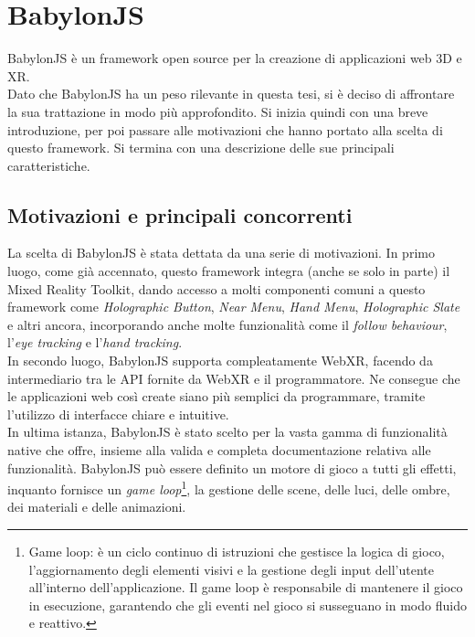 \section{BabylonJS}\label{sec:BabylonJS}
BabylonJS è un framework open source per la creazione di applicazioni web 3D e XR\cite{BabylonJS}.\\
Dato che BabylonJS ha un peso rilevante in questa tesi, si è deciso di affrontare la sua trattazione in modo più approfondito. Si inizia quindi con una breve introduzione, per poi
passare alle motivazioni che hanno portato alla scelta di questo framework. Si termina con una descrizione delle sue principali caratteristiche.\\

\subsection{Motivazioni e principali concorrenti}\label{subsec:BabylonJS_motivazioni}
La scelta di BabylonJS è stata dettata da una serie di motivazioni. In primo luogo, come già accennato, questo framework integra (anche se solo in parte) il Mixed Reality
Toolkit, dando accesso a molti componenti comuni a questo framework come \textit{Holographic Button}, \textit{Near Menu}, \textit{Hand Menu}, \textit{Holographic Slate} e altri 
ancora, incorporando anche molte funzionalità come il \textit{follow behaviour}, l'\textit{eye tracking} e l'\textit{hand tracking}.\\
In secondo luogo, BabylonJS supporta compleatamente WebXR, facendo da intermediario tra le API fornite da WebXR e il programmatore. Ne consegue che le applicazioni web così
create siano più semplici da programmare, tramite l'utilizzo di interfacce chiare e intuitive.\\
In ultima istanza, BabylonJS è stato scelto per la vasta gamma di funzionalità native che offre, insieme alla valida e completa documentazione relativa alle funzionalità. BabylonJS
può essere definito un motore di gioco a tutti gli effetti, inquanto fornisce un \textit{game loop}\footnote{
    Game loop: è un ciclo continuo di istruzioni che gestisce la logica di gioco, l'aggiornamento degli elementi visivi e la gestione degli input dell'utente all'interno 
    dell'applicazione. Il game loop è responsabile di mantenere il gioco in esecuzione, garantendo che gli eventi nel gioco si  susseguano in modo fluido e reattivo.
}, la gestione delle scene, delle luci, delle ombre, dei materiali e 
delle animazioni.
\newline \newline
